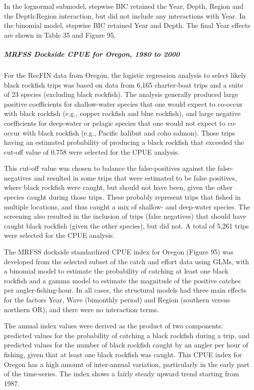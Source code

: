 \documentclass[11pt,
  english,
  letterpaper,
]{article}
\begin{document}
In the lognormal submodel, stepwise BIC retained the Year, Depth, Region and the Depth:Region interaction, but did not include any interactions with Year. In the binomial model, stepwise BIC retained Year and Depth. The final Year effects are shown in Table 35 and Figure 95.

\hypertarget{mrfss-dockside-cpue-for-oregon-1980-to-2000}{%
\subparagraph{MRFSS Dockside CPUE for Oregon, 1980 to 2000}\label{mrfss-dockside-cpue-for-oregon-1980-to-2000}}

For the RecFIN data from Oregon, the logistic regression analysis to select likely black rockfish trips was based on data from 6,165 charter-boat trips and a suite of 23 species (excluding black rockfish). The analysis generally produced large positive coefficients for shallow-water species that one would expect to co-occur with black rockfish (e.g., copper rockfish and blue rockfish), and large negative coefficients for deep-water or pelagic species that one would not expect to co-occur with black rockfish (e.g., Pacific halibut and coho salmon). Those trips having an estimated probability of producing a black rockfish that exceeded the cut-off value of 0.758 were selected for the CPUE analysis.

This cut-off value was chosen to balance the false-positives against the false-negatives and resulted in some trips that were estimated to be false positives, where black rockfish were caught, but should not have been, given the other species caught during those trips. These probably represent trips that fished in multiple locations, and thus caught a mix of shallow- and deep-water species. The screening also resulted in the inclusion of trips (false negatives) that should have caught black rockfish (given the other species), but did not. A total of 5,261 trips were selected for the CPUE analysis.

The MRFSS dockside standardized CPUE index for Oregon (Figure 95) was developed from the selected subset of the catch and effort data using GLMs, with a binomial model to estimate the probability of catching at least one black rockfish and a gamma model to estimate the magnitude of the positive catches per angler-fishing-hour. In all cases, the structural models had three main effects for the factors Year, Wave (bimonthly period) and Region (southern versus northern OR), and there were no interaction terms.

The annual index values were derived as the product of two components: predicted values for the probability of catching a black rockfish during a trip, and predicted values for the number of black rockfish caught by an angler per hour of fishing, given that at least one black rockfish was caught. This CPUE index for Oregon has a high amount of inter-annual variation, particularly in the early part of the time-series. The index shows a fairly steady upward trend starting from 1987.
\end{document}
